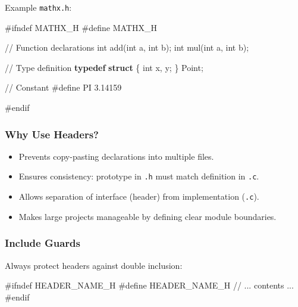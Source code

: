 \documentclass[
  letterpaper,
  DIV=11,
  numbers=noendperiod]{scrreprt}
\newenvironment{Shaded}{\begin{snugshade}}{\end{snugshade}}
\newcommand{\CommentTok}[1]{\textcolor[rgb]{0.37,0.37,0.37}{#1}}
\newcommand{\DataTypeTok}[1]{\textcolor[rgb]{0.68,0.00,0.00}{#1}}
\newcommand{\FloatTok}[1]{\textcolor[rgb]{0.68,0.00,0.00}{#1}}
\newcommand{\KeywordTok}[1]{\textcolor[rgb]{0.00,0.23,0.31}{\textbf{#1}}}
\newcommand{\NormalTok}[1]{\textcolor[rgb]{0.00,0.23,0.31}{#1}}
\newcommand{\OperatorTok}[1]{\textcolor[rgb]{0.37,0.37,0.37}{#1}}
\newcommand{\PreprocessorTok}[1]{\textcolor[rgb]{0.68,0.00,0.00}{#1}}
\providecommand{\tightlist}{%
  \setlength{\itemsep}{0pt}\setlength{\parskip}{0pt}}
\begin{document}
Example \texttt{mathx.h}:

\begin{Shaded}
\begin{Highlighting}[]
\PreprocessorTok{\#ifndef MATHX\_H}
\PreprocessorTok{\#define MATHX\_H}

\CommentTok{// Function declarations}
\DataTypeTok{int}\NormalTok{ add}\OperatorTok{(}\DataTypeTok{int}\NormalTok{ a}\OperatorTok{,} \DataTypeTok{int}\NormalTok{ b}\OperatorTok{);}
\DataTypeTok{int}\NormalTok{ mul}\OperatorTok{(}\DataTypeTok{int}\NormalTok{ a}\OperatorTok{,} \DataTypeTok{int}\NormalTok{ b}\OperatorTok{);}

\CommentTok{// Type definition}
\KeywordTok{typedef} \KeywordTok{struct} \OperatorTok{\{}
    \DataTypeTok{int}\NormalTok{ x}\OperatorTok{,}\NormalTok{ y}\OperatorTok{;}
\OperatorTok{\}}\NormalTok{ Point}\OperatorTok{;}

\CommentTok{// Constant}
\PreprocessorTok{\#define PI }\FloatTok{3.14159}

\PreprocessorTok{\#endif}
\end{Highlighting}
\end{Shaded}

\subsubsection{Why Use Headers?}\label{why-use-headers}

\begin{itemize}
\tightlist
\item
  Prevents copy-pasting declarations into multiple files.
\item
  Ensures consistency: prototype in \texttt{.h} must match definition in
  \texttt{.c}.
\item
  Allows separation of interface (header) from implementation
  (\texttt{.c}).
\item
  Makes large projects manageable by defining clear module boundaries.
\end{itemize}

\subsubsection{Include Guards}\label{include-guards-1}

Always protect headers against double inclusion:

\begin{Shaded}
\begin{Highlighting}[]
\PreprocessorTok{\#ifndef HEADER\_NAME\_H}
\PreprocessorTok{\#define HEADER\_NAME\_H}
\CommentTok{// ... contents ...}
\PreprocessorTok{\#endif}
\end{Highlighting}
\end{Shaded}
\end{document}
